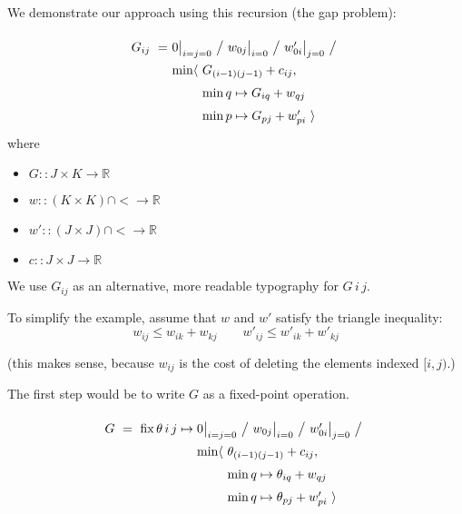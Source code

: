 \documentclass{article}
\newcommand\R{\mathbb{R}}
\begin{document}
We demonstrate our approach using this recursion (the gap problem):

\[
\renewcommand\arraystretch{1.5}
\begin{array}{l@{}l}
G_{ij} ~=~  &
  0\big|_{i=j=0} ~\big/~ w_{0j}\big|_{i=0} ~\big/~ w'_{0i}\big|_{j=0}
  ~\big/~ \\
  &
  \begin{array}{@{}l@{~}l}
    \min\langle & G_{(i-1)(j-1)} + c_{ij}, \\
                & \min q\mapsto G_{iq} + w_{qj} \\
                & \min p\mapsto G_{pj} + w'_{pi}~\rangle
  \end{array}
\end{array}
\]
%
where
\begin{itemize}
  \item $G :: J\times K \to \R$
  \item $w :: (K \times K)\cap{<} \to \R$
  \item $w' :: (J \times J)\cap{<} \to \R$
  \item $c :: J \times J \to \R$
\end{itemize}

We use $G_{ij}$ as an alternative, more readable typography for $G\,i\,j$.

To simplify the example, assume that $w$ and $w'$ satisfy the triangle inequality:
%
\begin{equation}
w_{ij} \leq w_{ik} + w_{kj} \qquad w'_{ij} \leq w'_{ik} + w'_{kj}
\label{equ:triangle}
\end{equation}

(this makes sense, because $w_{ij}$ is the cost of deleting the elements indexed $[i,j)$.)

\bigskip
The first step would be to write $G$ as a fixed-point operation.

\[
\renewcommand\arraystretch{1.5}
\begin{array}{l@{}l}
G ~=~ \mathrm{fix}\, \theta\,i\,j \mapsto{} &
  0\big|_{i=j=0} ~\big/~ w_{0j}\big|_{i=0} ~\big/~ w'_{0i}\big|_{j=0}
  ~\big/~ \\
  &
  \begin{array}{@{}l@{~}l}
    \min\langle & \theta_{(i-1)(j-1)} + c_{ij}, \\
                & \min q\mapsto \theta_{iq} + w_{qj} \\
                & \min q\mapsto \theta_{pj} + w'_{pi}~\rangle
  \end{array}
\end{array}
\]
\end{document}
